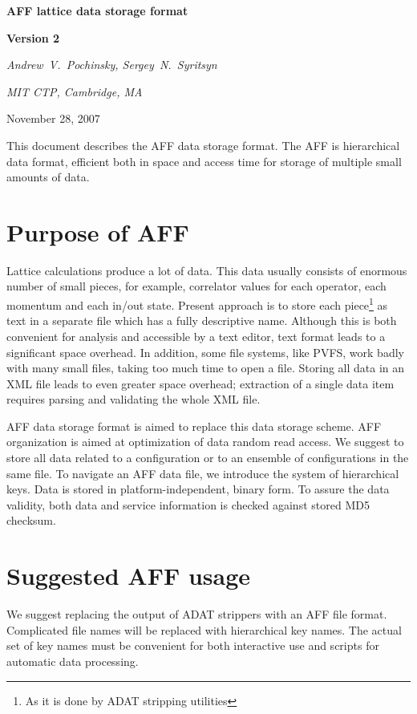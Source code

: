 \documentclass[10pt,letterpaper]{article}
\begin{document}
\centerline{\huge\bf AFF lattice data storage format}
\vspace{15pt}
\centerline{\huge\bf Version 2}
\vspace{20pt}
\centerline{\it Andrew~V.~Pochinsky, Sergey~N.~Syritsyn}
\centerline{\it MIT CTP, Cambridge, MA}
\vspace{10pt}
\centerline{November 28, 2007}
\vspace{20pt}

\noindent This document describes the AFF data storage format. 
The AFF is hierarchical data format, efficient both in space and access time 
for storage of multiple small amounts of data.

\newpage
\tableofcontents
\newpage

\section{Purpose of AFF}
Lattice calculations produce a lot of data. 
This data usually consists of enormous number of small pieces, for example, correlator values for
each operator, each momentum and each in/out state.
Present approach is to store each piece\footnote{As it is done by ADAT stripping utilities}
as text in a separate file which has a fully descriptive name. 
Although this is both convenient for analysis and accessible by a text editor, text format leads
to a significant space overhead. 
In addition, some file systems, like PVFS, work badly with
many small files, taking too much time to open a file. 
Storing all data in an XML file leads to even greater space overhead; extraction of a single
data item requires parsing and validating the whole XML file.

AFF data storage format is aimed to replace this data storage scheme. 
AFF organization is aimed at optimization of data random read access.
We suggest to store all data related to a configuration or to an ensemble of configurations in
the same file.
To navigate an AFF data file, we introduce the system of hierarchical keys.
Data is stored in platform-independent, binary form.
To assure the data validity, both data and service information is checked against stored
MD5 checksum.

\pagebreak
\section{Suggested AFF usage}

We suggest replacing the output of ADAT strippers with an AFF file format. 
Complicated file names will be replaced with hierarchical key names. 
The actual set of key names must be convenient for both interactive use and 
scripts for automatic data processing.
\end{document}
